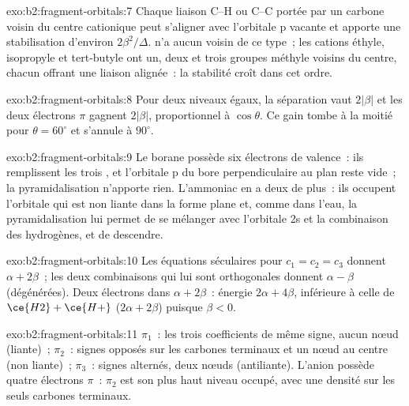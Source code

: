 \begin{solution}{exo:b2:fragment-orbitals:7}
Chaque liaison C--H ou C--C portée par un carbone voisin du centre cationique peut s'aligner avec
l'orbitale p vacante et apporte une stabilisation d'environ $2\beta^2/\Delta$.  n'a aucun voisin
de ce type~; les cations éthyle, isopropyle et tert-butyle ont un, deux et trois groupes
méthyle voisins du centre, chacun offrant une liaison alignée~: la stabilité croît dans cet
ordre.
\end{solution}

\begin{solution}{exo:b2:fragment-orbitals:8}
Pour deux niveaux égaux, la séparation vaut $2|\beta|$ et les deux électrons $\pi$ gagnent $2|\beta|$,
proportionnel à $\cos\theta$. Ce gain tombe à la moitié pour $\theta = 60^\circ$ et s'annule à
$90^\circ$.
\end{solution}

\begin{solution}{exo:b2:fragment-orbitals:9}
Le borane possède six électrons de valence~: ils remplissent les trois , et l'orbitale p
du bore perpendiculaire au plan reste vide~; la pyramidalisation n'apporte rien.
L'ammoniac en a deux de plus~: ils occupent l'orbitale qui est non liante dans
la forme plane et, comme dans l'eau, la pyramidalisation lui permet de se mélanger avec l'orbitale 2s et
la combinaison des hydrogènes, et de descendre.
\end{solution}

\begin{solution}{exo:b2:fragment-orbitals:10}
Les équations séculaires pour $c_1 = c_2 = c_3$ donnent $\alpha + 2\beta$~; les deux combinaisons
qui lui sont orthogonales donnent $\alpha - \beta$ (dégénérées). Deux électrons dans $\alpha + 2\beta$~: énergie
$2\alpha + 4\beta$, inférieure à celle de $\ce{H2} + \ce{H+}$ ($2\alpha + 2\beta$) puisque $\beta < 0$.
\end{solution}

\begin{solution}{exo:b2:fragment-orbitals:11}
$\pi_1$~: les trois coefficients de même signe, aucun nœud (liante)~; $\pi_2$~: signes opposés
sur les carbones terminaux et un nœud au centre (non liante)~; $\pi_3$~: signes
alternés, deux nœuds (antiliante). L'anion possède quatre électrons $\pi$~: $\pi_2$ est son
plus haut niveau occupé, avec une densité sur les seuls carbones terminaux.
\end{solution}

